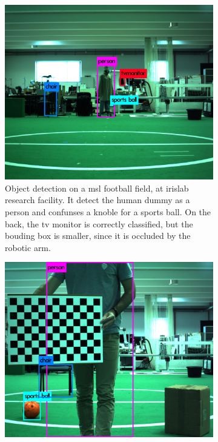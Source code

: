 \begin{figure}[ht]
	\centering
	\begin{subfigure}[t]{0.45\textwidth}
		\includegraphics[width=\textwidth]{img/object-detection/experimental-2.jpg}
		\caption{Object detection on a \ac{msl} football field, at \ac{irislab} research facility.  It detect the human dummy as a person and confunses a knoble for a sports ball. On the back, the tv monitor is correctly classified, but the bouding box is smaller, since it is occluded by the robotic arm.}
		\label{fig:experimental-yolo-2}
	\end{subfigure}
	\qquad
	\begin{subfigure}[t]{0.45\textwidth}
		\includegraphics[width=\textwidth]{img/object-detection/experimental-1.jpg}

\end{subfigure}
\end{figure}
